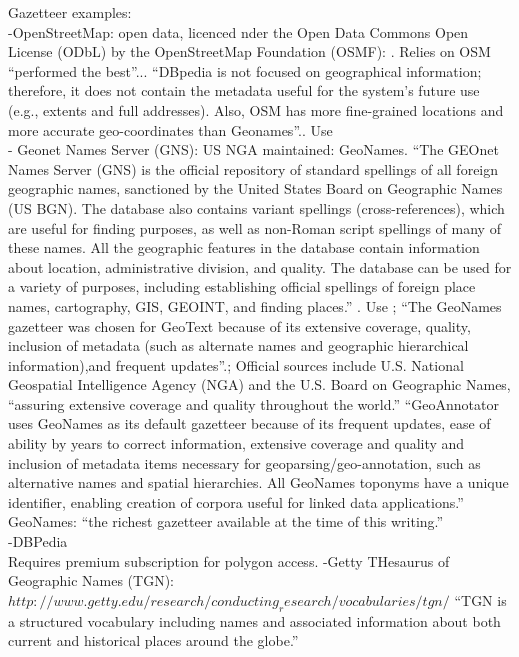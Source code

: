 Gazetteer examples:\\
-OpenStreetMap: {\color{orange} open data, licenced nder the Open Data Commons Open License (ODbL) by the OpenStreetMap Foundation (OSMF): \cite{OSM2020}}. {\color{orange}Relies on OSM “performed the best”... “DBpedia is not focused on geographical information; therefore, it does not contain the metadata useful for the system’s future use (e.g., extents and full addresses). Also, OSM has more fine-grained locations and more accurate geo-coordinates than Geonames”.\cite{Al-Olimat2018}}. Use \cite{Al-Olimat2018}\\
- Geonet Names Server (GNS): {\color{orange} US NGA maintained: GeoNames. ``The GEOnet Names Server (GNS) is the official repository of standard spellings of all foreign geographic names, sanctioned by the United States Board on Geographic Names (US BGN). The database also contains variant spellings (cross-references), which are useful for finding purposes, as well as non-Roman script spellings of many of these names. All the geographic features in the database contain information about location, administrative division, and quality. The database can be used for a variety of purposes, including establishing official spellings of foreign place names, cartography, GIS, GEOINT, and finding places.'' \cite{NGA2020}}. Use \cite{Al-Olimat2018}; {\color{orange}“The GeoNames gazetteer was chosen for GeoText because of its extensive coverage, quality, inclusion of metadata (such as alternate names and geographic hierarchical information),and frequent updates”.\cite{Karimzadeh2019a}}; {\color{orange}Official sources include U.S. National Geospatial Intelligence Agency (NGA) and the U.S. Board on Geographic Names, “assuring extensive coverage and quality throughout the world.”\cite{Karimzadeh2019a}} {\color{orange}“GeoAnnotator uses GeoNames as its default gazetteer because of its frequent updates, ease of ability by years to correct information, extensive coverage and quality and inclusion of metadata items necessary for geoparsing/geo-annotation, such as alternative names and spatial hierarchies. All GeoNames toponyms have a unique identifier, enabling creation of corpora useful for linked data applications.” GeoNames: “the richest gazetteer available at the time of this writing.”\cite{Karimzadeh2019}}\\
-{\color{orange}DBPedia\cite{Al-Olimat2018}}\\ Requires premium subscription for polygon access.
-Getty THesaurus of Geographic Names (TGN): $http://www.getty.edu/research/conducting_research/vocabularies/tgn/$ “TGN is a structured vocabulary including names and associated information about both current and historical places around the globe.”\cite{Silva2006}\\


